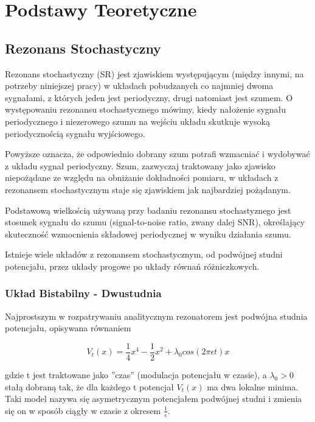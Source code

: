   \section{Podstawy Teoretyczne}
  
  \subsection{Rezonans Stochastyczny}
  
  Rezonans stochastyczny (SR) jest zjawiskiem występującym (między innymi, na potrzeby niniejszej pracy) w układach pobudzanych co najmniej dwoma sygnałami, z których jeden jest periodyczny, drugi natomiast jest szumem. O występowaniu rezonansu stochastycznego mówimy, kiedy nałożenie sygnału periodycznego i niezerowego szumu na wejściu układu skutkuje wysoką periodycznością sygnału wyjściowego.
  
  Powyższe oznacza, że odpowiednio dobrany szum potrafi wzmacniać i wydobywać z układu sygnał periodyczny. Szum, zazwyczaj traktowany jako zjawisko niepożądane ze względu na obniżanie dokładności pomiaru, w układach z rezonansem stochastycznym staje się zjawiskiem jak najbardziej pożądanym. 
  
  Podstawową wielkością używaną przy badaniu rezonansu stochastyznego jest stosunek sygnału do szumu (signal-to-noise ratio, zwany dalej SNR), określający skuteczność wzmocnienia składowej periodycznej w wyniku działania szumu.

  Istnieje wiele układów z rezonansem stochastycznym, od podwójnej studni potencjału, przez układy progowe po układy równań różniczkowych.

  \subsubsection{Układ Bistabilny - Dwustudnia}

  Najprostszym w rozpatrywaniu analitycznym rezonatorem jest podwójna studnia potencjału, opisywana równaniem

  \begin{equation} \label{sr:1}
    V_t(x) = \frac{1}{4} x^4 - \frac{1}{2} x^2 + \lambda_0 cos(2 \pi \epsilon t) x
  \end{equation}

  gdzie t jest traktowane jako ''czas'' (modulacja potencjału w czasie), a $\lambda_0 > 0$ stałą dobraną tak, że dla każdego t potencjał $V_t(x)$ ma dwa lokalne minima. Taki model nazywa się asymetrycznym potencjałem podwójnej studni i zmienia się on w sposób ciągły w czasie z okresem $\frac{1}{\epsilon}$.


